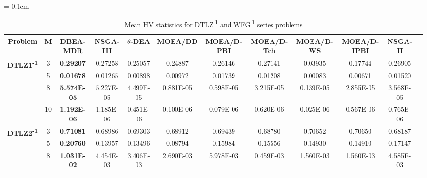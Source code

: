 \documentclass{sig-alternate}
\begin{document}
\begin{table}[!htb]\scriptsize
	\centering
	\renewcommand{\arraystretch}{0.9}
	\caption{Mean HV statistics for DTLZ\textsuperscript{-1} and WFG\textsuperscript{-1} series problems}
	\label{tab:HVminus}
	\tabcolsep = 0.1cm
	\begin{tabular}{|c|c|c|c|c|c|c|c|c|c|c|c|}
		\noalign{\smallskip}\hline
		\textbf{Problem}                                      & \textbf{M} & \textbf{DBEA-MDR}   & \textbf{NSGA-III}  & \textbf{$\theta$-DEA} & \textbf{MOEA/DD} & \textbf{MOEA/D-PBI} & \textbf{MOEA/D-Tch} & \textbf{MOEA/D-WS} & \textbf{MOEA/D-IPBI} & \textbf{NSGA-II}   \\ \hline
\multirow{4}{*}{\textbf{DTLZ1\textsuperscript{-1}}} & 3          & \textbf{0.29207}   & 0.27258            & 0.25057               & 0.24887          & 0.26146             & 0.27141             & 0.03935            & 0.17744              & 0.26905            \\ \cline{2-11} 
                                                      & 5          & \textbf{0.01678}   & 0.01265            & 0.00898               & 0.00972          & 0.01739             & 0.01208             & 0.00083            & 0.00671              & 0.01520            \\ \cline{2-11} 
                                                      & 8          & \textbf{5.574E-05} & 5.227E-05          & 4.499E-05             & 0.881E-05        & 0.598E-05           & 3.215E-05           & 0.139E-05          & 2.855E-05            & 3.568E-05          \\ \cline{2-11} 
                                                      & 10         & \textbf{1.192E-06} & 1.185E-06          & 0.451E-06             & 0.100E-06        & 0.079E-06           & 0.620E-06           & 0.025E-06          & 0.567E-06            & 0.765E-06          \\ \hline
\multirow{4}{*}{\textbf{DTLZ2\textsuperscript{-1}}} & 3          & \textbf{0.71081}   & 0.68986            & 0.69303               & 0.68912          & 0.69439             & 0.68780             & 0.70652            & 0.70650              & 0.68187            \\ \cline{2-11} 
                                                      & 5          & \textbf{0.20760}   & 0.13957            & 0.13496               & 0.08794          & 0.15984             & 0.15556             & 0.14930            & 0.14910              & 0.17147            \\ \cline{2-11} 
                                                      & 8          & \textbf{1.031E-02} & 4.454E-03          & 3.406E-03             & 2.690E-03        & 5.978E-03           & 0.459E-03           & 1.560E-03          & 1.560E-03            & 4.585E-03          \\ \cline{2-11} 

\end{tabular}
\end{table}
\end{document}

